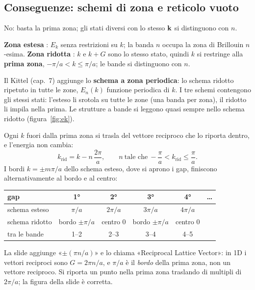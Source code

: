 \documentclass[11pt,a4paper]{article}
\begin{document}
\subsection{Conseguenze: schemi di zona e reticolo vuoto}\label{sec:ripiegato}
No: basta la prima zona; gli stati diversi con lo stesso $\mathbf k$ si distinguono con $n$.
\begin{definizione}
\textbf{Zona estesa} : $E_k$ senza restrizioni su $k$; la banda $n$ occupa la zona di Brillouin $n$-esima.
\textbf{Zona ridotta} : $k$ e $k+G$ sono lo stesso stato, quindi $k$ si restringe alla \textbf{prima zona}, $-\pi/a<k\le\pi/a$;
le bande si distinguono con $n$.
\end{definizione}
Il Kittel (cap.~7) aggiunge lo \textbf{schema a zona periodica}: lo schema ridotto ripetuto in tutte le zone, $E_n(k)$ funzione periodica di $k$. I tre
schemi contengono gli stessi stati: l'esteso li srotola su tutte le zone (una banda per zona), il ridotto li impila nella prima. Le strutture a bande si
leggono quasi sempre nello schema ridotto (figura~\ref{fig:ek}).

Ogni $k$ fuori dalla prima zona si trasla del vettore reciproco che lo riporta dentro, e l'energia non cambia:
\[
k_{\mathrm{rid}}=k-n\,\frac{2\pi}a,\qquad n\ \text{tale che}\ -\frac\pi a<k_{\mathrm{rid}}\le\frac\pi a .
\]
I bordi $k=\pm m\pi/a$ dello schema esteso, dove si aprono i gap, finiscono alternativamente al bordo e al centro:
\begin{center}\small
\begin{tabular}{@{}lccccc@{}}
\toprule
gap & 1° & 2° & 3° & 4° & \dots\\
\midrule
schema esteso & $\pi/a$ & $2\pi/a$ & $3\pi/a$ & $4\pi/a$ & \\
schema ridotto & bordo $\pm\pi/a$ & centro $0$ & bordo $\pm\pi/a$ & centro $0$ & \\
tra le bande & 1--2 & 2--3 & 3--4 & 4--5 & \\
\bottomrule
\end{tabular}
\end{center}

\begin{osservazione}
La slide aggiunge «$\pm(\pi n/a)$» e lo chiama «Reciprocal Lattice Vector»: in 1D i vettori reciproci sono $G=2\pi n/a$, e $\pi/a$ è il \emph{bordo} della
prima zona, non un vettore reciproco. Si riporta un punto nella prima zona traslando di multipli di $2\pi/a$; la figura della slide è corretta.
\end{osservazione}
\end{document}
